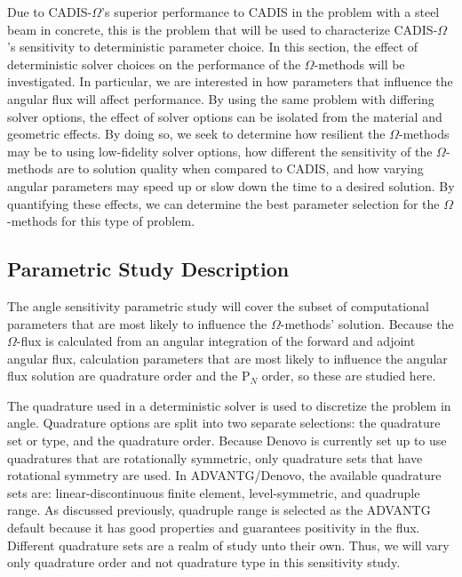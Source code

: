 Due to CADIS-$\Omega$'s superior performance to CADIS
in the problem with a steel beam in concrete, this is the problem that will be
used to characterize CADIS-$\Omega$'s sensitivity to deterministic
parameter choice.
In this section, the effect of deterministic solver choices on the
performance of the $\Omega$-methods will be investigated. In particular, we are
interested in how parameters that influence the angular flux will affect 
performance. By using the same problem
with differing solver options, the effect of solver options can be isolated from
the material and geometric effects. By doing so, we seek to determine how
resilient the $\Omega$-methods may be to using low-fidelity solver options, how
different the sensitivity of the $\Omega$-methods are to solution quality when
compared to CADIS, and how varying angular parameters may speed up or slow down
the time to a desired solution. By quantifying these effects, we can determine
the best parameter selection for the $\Omega$-methods for this type of problem.

\subsection{Parametric Study Description}
\label{subsec:parstudy}

The angle sensitivity parametric study will cover the subset of computational parameters
that are most likely to influence the $\Omega$-methods' solution. Because the
$\Omega$-flux is calculated from an angular integration of the forward and adjoint angular
flux, calculation parameters that are most likely to influence the angular flux
solution are quadrature order and the P$_N$ order, so these are studied here. 

The quadrature used in a deterministic solver is used to discretize the
problem in angle. Quadrature options are split into two separate selections: the
quadrature set or type, and the quadrature order. Because Denovo is currently set up to use
quadratures that are rotationally symmetric, 
only quadrature sets that have rotational
symmetry are used. In ADVANTG/Denovo, the available
quadrature sets are: linear-discontinuous finite element, level-symmetric, and
quadruple range. As discussed previously, quadruple range is selected as the
ADVANTG default because it has good properties and guarantees positivity in the
flux. 
Different quadrature sets are a realm of study unto their own. Thus, we will vary only
quadrature order and not quadrature type in this sensitivity study.

